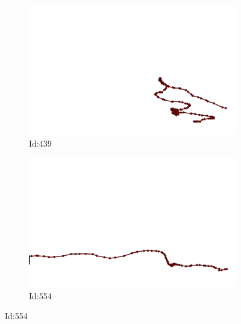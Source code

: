 \documentclass[12pt,twoside]{report}
\begin{document}
\begin{figure}
\centering
\begin{subfigure}[b]{0.20\textwidth}
\centering
\includegraphics[width=\textwidth]{../../trajectories/439.png}
\caption{Id:439}
\end{subfigure}
\begin{subfigure}[b]{0.20\textwidth}
\centering
\includegraphics[width=\textwidth]{../../trajectories/554.png}
\caption{Id:554}
\end{subfigure}
\end{figure}
\end{document}
